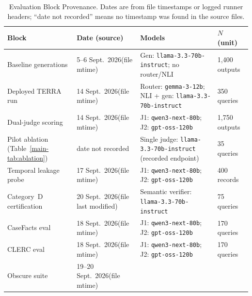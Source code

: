 \par\begingroup
  
  \small
  
  
  \begin{longtable}{@{}p{3.8cm}p{2.2cm}p{5.2cm}p{1.4cm}@{}}
\caption{Evaluation Block Provenance. Dates are from file timestamps or
           logged runner headers; ``date not recorded'' means no timestamp
           was found in the source files.}\label{tab:run_provenance}\\
    \toprule
    \textbf{Block} & \textbf{Date (source)} & \textbf{Models} & \textbf{$N$ (unit)} \\
    \midrule
    Baseline generations & 5--6 Sept.\ 2026\newline (file mtime) &
      Gen: \texttt{llama-3.3-70b-instruct}; no router/NLI &
      1,400 outputs \\
    \addlinespace
    Deployed TERRA run & 14 Sept.\ 2026\newline (file mtime) &
      Router: \texttt{gemma-3-12b}; NLI + gen: \texttt{llama-3.3-70b-instruct} &
      350 queries \\
    \addlinespace
    Dual-judge scoring & 14 Sept.\ 2026\newline (file mtime) &
      J1: \texttt{qwen3-next-80b}; J2: \texttt{gpt-oss-120b} &
      1,750 outputs \\
    \addlinespace
    Pilot ablation (Table~\ref{main-tab:ablation}) & date not recorded &
      Single judge: \texttt{llama-3.3-70b-instruct} (recorded endpoint) & 35 queries \\
    \addlinespace
    Temporal leakage probe & 17 Sept.\ 2026\newline (file mtime) &
      J1: \texttt{qwen3-next-80b}; J2: \texttt{gpt-oss-120b} & 400 records \\
    \addlinespace
    Category~D certification & 20 Sept.\ 2026\newline (file last modified) &
      Semantic verifier: \texttt{llama-3.3-70b-instruct} & 75 queries \\
    \addlinespace
    CaseFacts eval & 18 Sept.\ 2026\newline (file mtime) &
      J1: \texttt{qwen3-next-80b}; J2: \texttt{gpt-oss-120b} & 170 queries \\
    \addlinespace
    CLERC eval & 18 Sept.\ 2026\newline (file mtime) &
      J1: \texttt{qwen3-next-80b}; J2: \texttt{gpt-oss-120b} & 170 queries \\
    \addlinespace
    Obscure suite & 19--20 Sept.\ 2026\newline (file mtime) &

\end{longtable}
